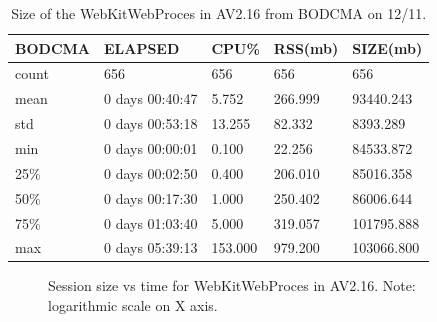 \documentclass{article}
\begin{document}
\begin{table}[H]
\begin{tabular}{|l|l|l|l|l|}
\hline BODCMA&                      ELAPSED&        CPU\%&     RSS(mb)&       SIZE(mb) \\
\hline count&                     656&  656&  656&     656 \\
\hline mean&   0 days 00:40:47&    5.752&  266.999&   93440.243 \\
\hline std&    0 days 00:53:18&   13.255&   82.332&    8393.289 \\
\hline min&           0 days 00:00:01&    0.100&   22.256&   84533.872 \\
\hline 25\%&           0 days 00:02:50&    0.400&  206.010&   85016.358 \\
\hline 50\%&    0 days 00:17:30&    1.000&  250.402&   86006.644 \\
\hline 75\%&    0 days 01:03:40&    5.000&  319.057&  101795.888 \\
\hline max&           0 days 05:39:13&  153.000&  979.200&  103066.800 \\
\hline 
\end{tabular}
\caption{\label{TABLE-AV216WebKitWeb}Size of the WebKitWebProces in AV2.16 from BODCMA on 12/11.} 
\end{table}



\begin{figure}[H]
        \caption{\label{FIGURE-AV216WebKitWebSizeVsTime} Session size vs time for WebKitWebProces in AV2.16. Note: logarithmic scale on X axis.}
\end{figure}
\end{document}
